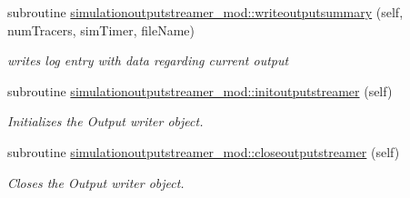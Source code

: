\begin{DoxyCompactItemize}
subroutine \mbox{\hyperlink{namespacesimulationoutputstreamer__mod_a8b34c75e869c6409de7d6e5ceca5cca7}{simulationoutputstreamer\+\_\+mod\+::writeoutputsummary}} (self, num\+Tracers, sim\+Timer, file\+Name)
\begin{DoxyCompactList}\small\item\em writes log entry with data regarding current output \end{DoxyCompactList}\item 
subroutine \mbox{\hyperlink{namespacesimulationoutputstreamer__mod_a9ab3e2101fbed18ea896729f7201e1aa}{simulationoutputstreamer\+\_\+mod\+::initoutputstreamer}} (self)
\begin{DoxyCompactList}\small\item\em Initializes the Output writer object. \end{DoxyCompactList}\item 
subroutine \mbox{\hyperlink{namespacesimulationoutputstreamer__mod_adc0f21d337c283eee1f5f13b2eb51d52}{simulationoutputstreamer\+\_\+mod\+::closeoutputstreamer}} (self)
\begin{DoxyCompactList}\small\item\em Closes the Output writer object. \end{DoxyCompactList}\end{DoxyCompactItemize}
